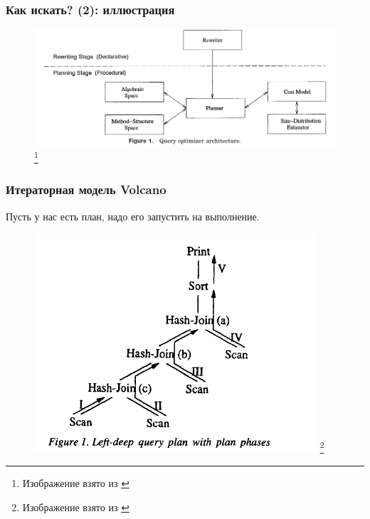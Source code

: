 \documentclass{beamer}
\begin{document}
\begin{frame}
\frametitle{Как искать? (2): иллюстрация}
\begin{figure}[htb]
\includegraphics[width=\textwidth,height=0.7\textheight,keepaspectratio]{overall-schema2.png} 
\footnote{\tiny{Изображение взято из \cite{Ioannidis1996}}}
\end{figure}
\end{frame}

\begin{frame}
\frametitle{Итераторная модель Volcano}

Пусть у нас есть план, надо его запустить на выполнение.

\begin{figure}[htb]
\includegraphics[width=\textwidth,height=0.7\textheight,keepaspectratio]{plan.png} 
\footnote{\tiny{Изображение взято из \cite{Graefe1996}}}
\end{figure}

\end{frame}
\end{document}
